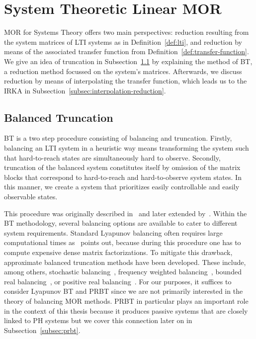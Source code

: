 \section{System Theoretic Linear MOR}\label{sec:system-mor}

\acl{MOR} for Systems Theory offers two main perspectives: reduction resulting from the system matrices of \ac{LTI} systems as in Definition~\ref{def:lti}, and reduction by means of the associated transfer function from Definition~\ref{def:transfer-function}.
We give an idea of truncation in Subsection~\ref{subsec:balanced-truncation} by explaining the method of \acf{BT}, a reduction method focussed on the system's matrices.
Afterwards, we discuss reduction by means of interpolating the transfer function, which leads us to the \acf{IRKA} in Subsection~\ref{subsec:interpolation-reduction}.

\subsection{Balanced Truncation}\label{subsec:balanced-truncation}

\ac{BT} is a two step procedure consisting of balancing and truncation.
Firstly, balancing an \ac{LTI} system in a heuristic way means transforming the system such that hard-to-reach states are simultaneously hard to observe.
Secondly, truncation of the balanced system constitutes itself by omission of the matrix blocks that correspond to hard-to-reach and hard-to-observe system states.
In this manner, we create a system that prioritizes easily controllable and easily observable states.

This procedure was originally described in~\cite{Mullis1976} and later extended by~\cite{Moore1981, Enns1984}.
Within the \ac{BT} methodology, several balancing options are available to cater to different system requirements.
Standard Lyapunov balancing often requires large computational times as~\cite{Gugercin2007} points out, because during this procedure one has to compute expensive dense matrix factorizations.
To mitigate this drawback, approximate balanced truncation methods have been developed.
These include, among others, stochastic balancing~\cite{Desai1984, Green1988}, frequency weighted balancing~\cite{Enns1984, Wang1999}, bounded real balancing~\cite{Opdenacker1988, Reis2010}, or positive real balancing~\cite{Desai1984, Ober1991}.
For our purposes, it suffices to consider Lyapunov \ac{BT} and \ac{PRBT} since we are not primarily interested in the theory of balancing \ac{MOR} methods.
\ac{PRBT} in particular plays an important role in the context of this thesis because it produces passive systems that are closely linked to \ac{PH} systems but we cover this connection later on in Subsection~\ref{subsec:prbt}.

